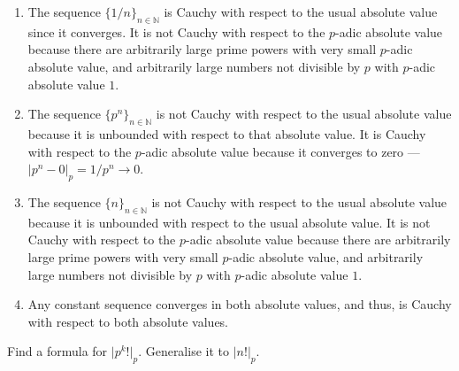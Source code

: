 \documentclass[12 pt, letterpaper]{hmcpset}
\begin{document}
\begin{solution}
	\begin{enumerate}
		\item The sequence $\{ 1 / n \}_{n \in \mathbb{N}}$ is Cauchy with respect to the usual absolute value since it converges. It is not Cauchy with respect to the $p$-adic absolute value because there are arbitrarily large prime powers with very small $p$-adic absolute value, and arbitrarily large numbers not divisible by $p$ with $p$-adic absolute value $1$.

		\item  The sequence  $\{ p^{n} \}_{n \in \mathbb{N}}$ is not Cauchy with respect to the usual absolute value because it is unbounded with respect to that absolute value. It is Cauchy with respect to the $p$-adic absolute value because it converges to zero --- $\lvert p^{n} - 0 \rvert_{p} = 1 / p^{n} \to 0$.

		\item The sequence $\{ n \}_{n \in \mathbb{N}}$ is not Cauchy with respect to the usual absolute value because it is unbounded with respect to the usual absolute value. It is not Cauchy with respect to the $p$-adic absolute value because there are arbitrarily large prime powers with very small $p$-adic absolute value, and arbitrarily large numbers not divisible by $p$ with $p$-adic absolute value $1$.

		\item Any constant sequence converges in both absolute values, and thus, is Cauchy with respect to both absolute values.
	\end{enumerate}
\end{solution}

\pagebreak

\begin{problem}
	Find a formula for $\lvert p^{k} ! \rvert_{p}$. Generalise it to $\lvert n! \rvert_{p}$.
\end{problem}
\end{document}
